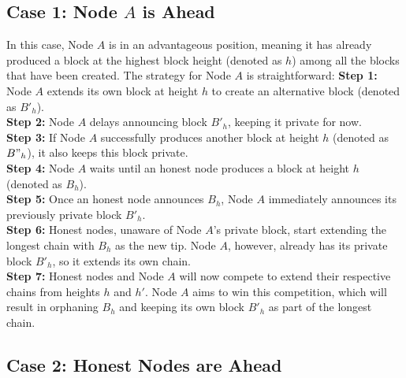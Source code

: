 \subsection*{Case 1: Node $A$ is Ahead}
In this case, Node $A$ is in an advantageous position, meaning it has already produced a block at the highest block height (denoted as $h$) among all the blocks that have been created. The strategy for Node $A$ is straightforward:
\noindent
\textbf{Step 1:} Node $A$ extends its own block at height $h$ to create an alternative block (denoted as $B'_{h}$).\\
\noindent
\textbf{Step 2:} Node $A$ delays announcing block $B'_h$, keeping it private for now.\\
\noindent
\textbf{Step 3:} If Node $A$ successfully produces another block at height $h$ (denoted as $B"_{h}$), it also keeps this block private.\\
\noindent
\textbf{Step 4:} Node $A$ waits until an honest node produces a block at height $h$ (denoted as $B_h$).\\
\noindent
\textbf{Step 5:} Once an honest node announces $B_h$, Node $A$ immediately announces its previously private block $B'_h$.\\
\noindent
\textbf{Step 6:} Honest nodes, unaware of Node $A$'s private block, start extending the longest chain with $B_h$ as the new tip. Node $A$, however, already has its private block $B'_h$, so it extends its own chain.\\
\noindent
\textbf{Step 7:} Honest nodes and Node $A$ will now compete to extend their respective chains from heights $h$ and $h'$. Node $A$ aims to win this competition, which will result in orphaning $B_h$ and keeping its own block $B'_h$ as part of the longest chain.\\

\subsection*{Case 2: Honest Nodes are Ahead}

